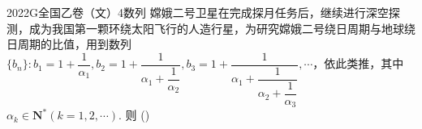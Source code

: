 
\begin{problem}{2022}{G}{全国乙卷（文）}{4}{数列}
嫦娥二号卫星在完成探月任务后，继续进行深空探测，成为我国第一颗环绕太阳飞行的人造行星，为研究嫦娥二号绕日周期与地球绕日周期的比值，用到数列 $\{b_n\}: b_1=1+\dfrac{1}{\alpha_1}, b_2=1+\dfrac{1}{\alpha_1+\dfrac{1}{\alpha_2}}, b_3=1+\dfrac{1}{\alpha_1+\dfrac{1}{\alpha_2+\dfrac{1}{\alpha_3}}}, \cdots$，依此类推，其中 $\alpha_k \in \mathbf{N}^*(k=1,2,\cdots)$. 则
(\hspace{1cm})
\begin{choices}
\end{choices}
\end{problem}